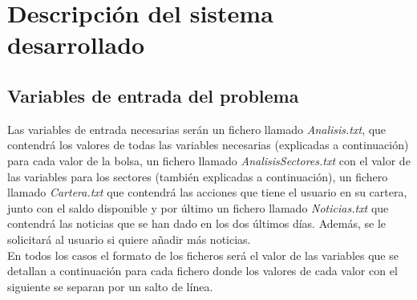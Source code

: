 \documentclass[12pt]{article}
\begin{document}
\section{Descripción del sistema desarrollado}

\subsection{Variables de entrada del problema}
Las variables de entrada necesarias serán un fichero llamado \textit{Analisis.txt}, que contendrá los valores de todas las variables necesarias (explicadas a continuación) para cada valor de la bolsa, un fichero llamado \textit{AnalisisSectores.txt} con el valor de las variables para los sectores (también explicadas a continuación), un fichero llamado \textit{Cartera.txt} que contendrá las acciones que tiene el usuario en su cartera, junto con el saldo disponible y por último un fichero llamado \textit{Noticias.txt} que contendrá las noticias que se han dado en los dos últimos días. Además, se le solicitará al usuario si quiere añadir más noticias.\\

En todos los casos el formato de los ficheros será el valor de las variables que se detallan a continuación para cada fichero donde los valores de cada valor con el siguiente se separan por un salto de línea.\\
\end{document}
